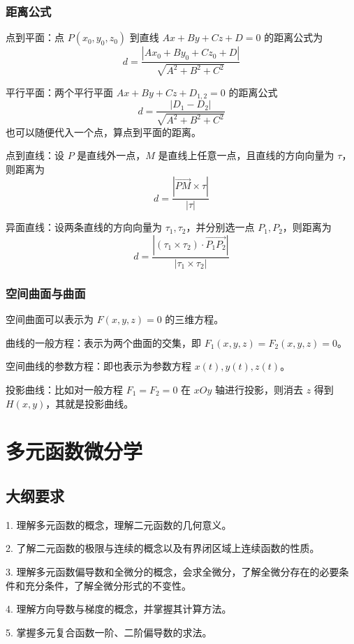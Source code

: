 \subsubsection*{距离公式}

点到平面：点 $P(x_0, y_0, z_0)$ 到直线 $Ax+By+Cz+D =0$ 的距离公式为
\[ d = \frac{|Ax_0 + By_0 + Cz_0 + D|}{\sqrt{A^2 + B^2 + C^2}} \]

平行平面：两个平行平面 $Ax+By+Cz+D_{1,2} = 0$ 的距离公式
\[ d = \frac{|D_1 - D_2|}{\sqrt{A^2 + B^2 + C^2}} \]
也可以随便代入一个点，算点到平面的距离。

点到直线：设 $P$ 是直线外一点，$M$ 是直线上任意一点，且直线的方向向量为 $\tau$，则距离为
\[ d = \frac{|\overrightarrow{PM} \times \tau|}{|\tau|} \]

异面直线：设两条直线的方向向量为 $\tau_1, \tau_2$，并分别选一点 $P_1, P_2$，则距离为
\[ d = \frac{|(\tau_1 \times \tau_2) \cdot \overrightarrow{P_1P_2}|}{|\tau_1 \times \tau_2|} \]

\subsubsection*{空间曲面与曲面}

空间曲面可以表示为 $F(x, y, z) = 0$ 的三维方程。

曲线的一般方程：表示为两个曲面的交集，即 $F_1(x,y,z) = F_2(x, y,z) = 0$。

空间曲线的参数方程：即也表示为参数方程 $x(t), y(t), z(t)$。

投影曲线：比如对一般方程 $F_1 = F_2 = 0$ 在 $xOy$ 轴进行投影，则消去 $z$ 得到 $H(x, y)$，其就是投影曲线。

\section{多元函数微分学}

\subsection{大纲要求}

1. 理解多元函数的概念，理解二元函数的几何意义。

2. 了解二元函数的极限与连续的概念以及有界闭区域上连续函数的性质。

3. 理解多元函数偏导数和全微分的概念，会求全微分，了解全微分存在的必要条件和充分条件，了解全微分形式的不变性。

4. 理解方向导数与梯度的概念，并掌握其计算方法。

5. 掌握多元复合函数一阶、二阶偏导数的求法。

